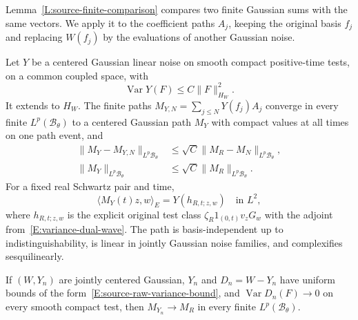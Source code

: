 Lemma~\ref{L:source-finite-comparison} compares two finite Gaussian sums with
the same vectors. We apply it to the coefficient paths $A_j$, keeping the
original basis $f_j$ and replacing $W(f_j)$ by the evaluations of another
Gaussian noise.

\begin{proposition}
  \label{P:source-gaussian-transfer}
  Let $Y$ be a centered Gaussian linear noise on smooth compact positive-time
  tests, on a common coupled space, with
  \begin{equation}\label{E:source-raw-variance-bound}
    \operatorname{Var}Y(F)\le C\|F\|_{H_W}^2.
  \end{equation}
  It extends to $H_W$. The finite paths $M_{Y,N} = \sum_{j\le N}Y(f_j)A_j$
  converge in every finite $L^p(\mathscr{B}_\theta)$ to a centered Gaussian path
  $M_Y$ with compact values at all times on one path event, and
  \begin{align}
    \|M_Y-M_{Y,N}\|_{L^p\mathscr{B}_\theta}
    &\le\sqrt C\|M_R-M_N\|_{L^p\mathscr{B}_\theta},\label{E:source-transfer-tail}\\
    \|M_Y\|_{L^p\mathscr{B}_\theta}
    &\le\sqrt C\|M_R\|_{L^p\mathscr{B}_\theta}.\label{E:source-transfer-norm}
  \end{align}
  For a fixed real Schwartz pair and time,
  \begin{equation}\label{E:source-transferred-row}
    \langle M_Y(t)z,w\rangle_E=Y(h_{R,t;z,w})\quad\text{in }L^2,
  \end{equation}
  where $h_{R,t;z,w}$ is the explicit original test class
  $\zeta_R1_{(0,t)}v_zG_w$ with the adjoint from~\eqref{E:variance-dual-wave}.
  The path is basis-independent up to indistinguishability, is linear in jointly
  Gaussian noise families, and complexifies sesquilinearly.

  If $(W,Y_n)$ are jointly centered Gaussian, $Y_n$ and $D_n = W-Y_n$ have
  uniform bounds of the form~\eqref{E:source-raw-variance-bound}, and
  $\operatorname{Var}D_n(F) \to 0$ on every smooth compact test, then $M_{Y_n}
  \to M_R$ in every finite $L^p(\mathscr{B}_\theta)$.
\end{proposition}

